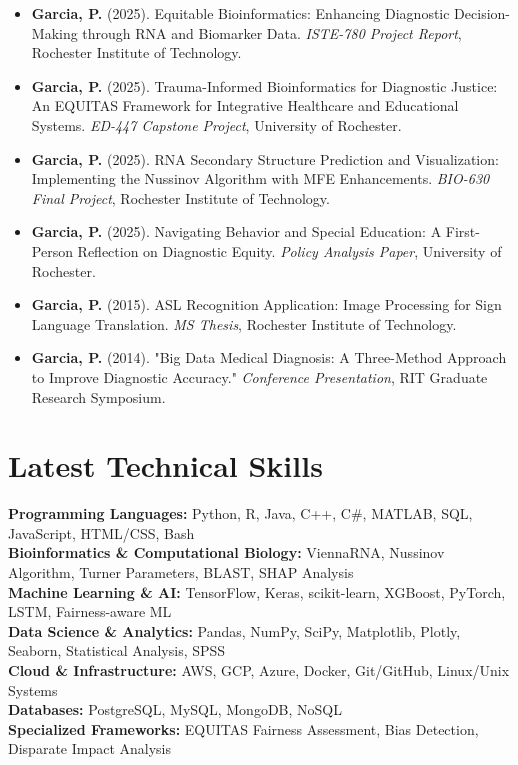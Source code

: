 \documentclass[10pt]{article}
\begin{document}
\begin{itemize}[leftmargin=*]
\item \textbf{Garcia, P.} (2025). Equitable Bioinformatics: Enhancing Diagnostic Decision-Making through RNA and Biomarker Data. \textit{ISTE-780 Project Report}, Rochester Institute of Technology.

\item \textbf{Garcia, P.} (2025). Trauma-Informed Bioinformatics for Diagnostic Justice: An EQUITAS Framework for Integrative Healthcare and Educational Systems. \textit{ED-447 Capstone Project}, University of Rochester.

\item \textbf{Garcia, P.} (2025). RNA Secondary Structure Prediction and Visualization: Implementing the Nussinov Algorithm with MFE Enhancements. \textit{BIO-630 Final Project}, Rochester Institute of Technology.

\item \textbf{Garcia, P.} (2025). Navigating Behavior and Special Education: A First-Person Reflection on Diagnostic Equity. \textit{Policy Analysis Paper}, University of Rochester.

\item \textbf{Garcia, P.} (2015). ASL Recognition Application: Image Processing for Sign Language Translation. \textit{MS Thesis}, Rochester Institute of Technology.

\item \textbf{Garcia, P.} (2014). "Big Data Medical Diagnosis: A Three-Method Approach to Improve Diagnostic Accuracy." \textit{Conference Presentation}, RIT Graduate Research Symposium.
\end{itemize}


\section{Latest Technical Skills}

\textbf{Programming Languages:} Python, R, Java, C++, C\#, MATLAB, SQL, JavaScript, HTML/CSS, Bash \\
\textbf{Bioinformatics \& Computational Biology:} ViennaRNA, Nussinov Algorithm, Turner Parameters, BLAST, SHAP Analysis \\
\textbf{Machine Learning \& AI:} TensorFlow, Keras, scikit-learn, XGBoost, PyTorch, LSTM, Fairness-aware ML \\
\textbf{Data Science \& Analytics:} Pandas, NumPy, SciPy, Matplotlib, Plotly, Seaborn, Statistical Analysis, SPSS \\
\textbf{Cloud \& Infrastructure:} AWS, GCP, Azure, Docker, Git/GitHub, Linux/Unix Systems \\
\textbf{Databases:} PostgreSQL, MySQL, MongoDB, NoSQL \\
\textbf{Specialized Frameworks:} EQUITAS Fairness Assessment, Bias Detection, Disparate Impact Analysis
\end{document}
